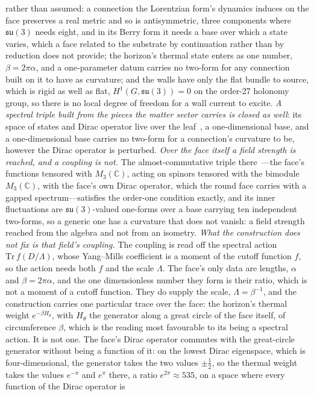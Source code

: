 \documentclass[11pt]{article}
\theoremstyle{plain}
\theoremstyle{remark}
\newcommand{\su}{\mathfrak{su}}
\begin{document}
rather than assumed: a connection the Lorentzian form's dynamics induces on the face preserves a real metric and so is antisymmetric, three components where $\su(3)$ needs eight, and in its Berry form it needs a base over which a state varies, which a face related to the substrate by continuation rather than by reduction does not provide; the horizon's thermal state enters as one number, $\beta=2\pi\alpha$, and a one-parameter datum carries no two-form for any connection built on it to have as curvature; and the walls have only the flat bundle to source, which is rigid as well as flat, $H^{1}(G,\su(3))=0$ on the order-27 holonomy group, so there is no local degree of freedom for a wall current to excite. \emph{A spectral triple built from the pieces the matter sector carries is closed as well}: its space of states and Dirac operator live over the leaf~\cite{JanzenMatter}, a one-dimensional base, and a one-dimensional base carries no two-form for a connection's curvature to be, however the Dirac operator is perturbed. \emph{Over the face itself a field strength is reached, and a coupling is not.} The almost-commutative triple there~\cite{ChamseddineConnes1997}---the face's functions tensored with $M_3(\mathbb{C})$, acting on spinors tensored with the bimodule $M_3(\mathbb{C})$, with the face's own Dirac operator, which the round face carries with a gapped spectrum---satisfies the order-one condition exactly, and its inner fluctuations are $\su(3)$-valued one-forms over a base carrying ten independent two-forms, so a generic one has a curvature that does not vanish: a field strength reached from the algebra and not from an isometry. \emph{What the construction does not fix is that field's coupling.} The coupling is read off the spectral action $\mathrm{Tr}\,f(D/\Lambda)$, whose Yang--Mills coefficient is a moment of the cutoff function $f$, so the action needs both $f$ and the scale $\Lambda$. The face's only data are lengths, $\alpha$ and $\beta=2\pi\alpha$, and the one dimensionless number they form is their ratio, which is not a moment of a cutoff function. They do supply the scale, $\Lambda=\beta^{-1}$, and the construction carries one particular trace over the face: the horizon's thermal weight $e^{-\beta H_\theta}$, with $H_\theta$ the generator along a great circle of the face itself, of circumference $\beta$, which is the reading most favourable to its being a spectral action. It is not one. The face's Dirac operator commutes with the great-circle generator without being a function of it: on the lowest Dirac eigenspace, which is four-dimensional, the generator takes the two values $\pm\tfrac12$, so the thermal weight takes the values $e^{-\pi}$ and $e^{\pi}$ there, a ratio $e^{2\pi}\approx 535$, on a space where every function of the Dirac operator is 
\end{document}
